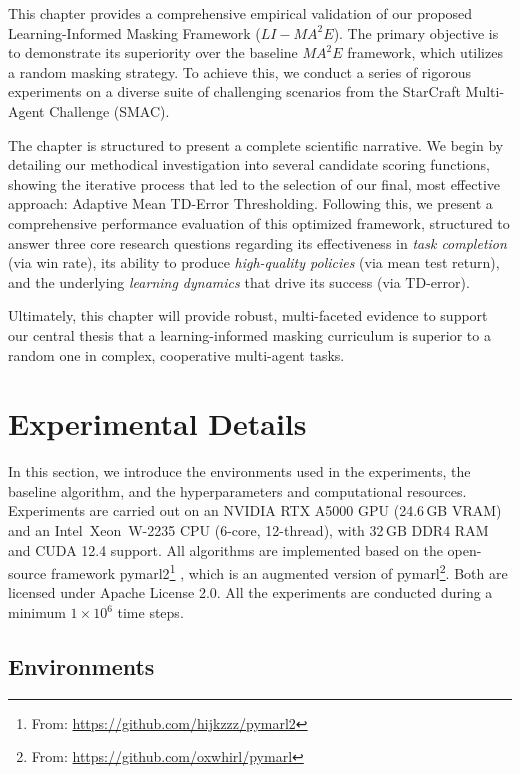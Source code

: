 This chapter provides a comprehensive empirical validation of our proposed Learning-Informed Masking Framework ($LI-{MA}^2E$). The primary objective is to demonstrate its superiority over the baseline ${MA}^2E$ framework, which utilizes a random masking strategy. To achieve this, we conduct a series of rigorous experiments on a diverse suite of challenging scenarios from the StarCraft Multi-Agent Challenge (SMAC).

The chapter is structured to present a complete scientific narrative. We begin by detailing our methodical investigation into several candidate scoring functions, showing the iterative process that led to the selection of our final, most effective approach: Adaptive Mean TD-Error Thresholding. Following this, we present a comprehensive performance evaluation of this optimized framework, structured to answer three core research questions regarding its effectiveness in \textit{task completion} (via win rate), its ability to produce \textit{high-quality policies} (via mean test return), and the underlying \textit{learning dynamics} that drive its success (via TD-error).

Ultimately, this chapter will provide robust, multi-faceted evidence to support our central thesis that a learning-informed masking curriculum is superior to a random one in complex, cooperative multi-agent tasks.

\section{Experimental Details}
In this section, we introduce the environments used in the experiments, the baseline algorithm, and the hyperparameters and computational resources. Experiments are carried out on an NVIDIA RTX A5000 GPU (24.6\,GB VRAM) and an Intel\textregistered\ Xeon\textregistered\ W-2235 CPU (6-core, 12-thread), with 32\,$\mathrm{GB}$ DDR4 RAM and CUDA 12.4 support. All algorithms are implemented based on the open-source framework pymarl2\footnote{From: \url{https://github.com/hijkzzz/pymarl2}}  \parencite{pymarl2}, which is an augmented version of pymarl\footnote{From: \url{https://github.com/oxwhirl/pymarl}}. Both are licensed under Apache License 2.0. 
 All the experiments are conducted during a minimum $1 \times 10^6$ time steps.

\subsection{Environments}
